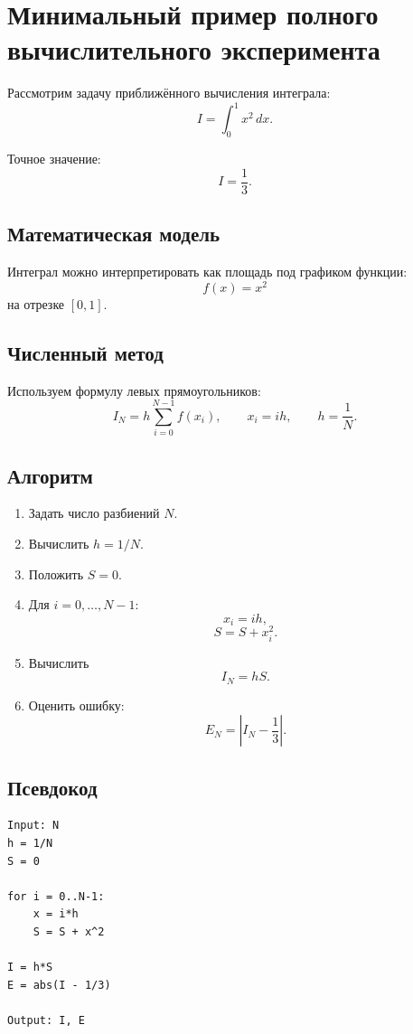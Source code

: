 \documentclass[12pt,a4paper]{article}
\theoremstyle{definition}
\theoremstyle{plain}
\begin{document}
\section{Минимальный пример полного вычислительного эксперимента}

Рассмотрим задачу приближённого вычисления интеграла:
\[
I=\int_0^1 x^2\,dx.
\]

Точное значение:
\[
I=\frac13.
\]

\subsection{Математическая модель}

Интеграл можно интерпретировать как площадь под графиком функции:
\[
f(x)=x^2
\]
на отрезке $[0,1]$.

\subsection{Численный метод}

Используем формулу левых прямоугольников:
\[
I_N
=
h\sum_{i=0}^{N-1} f(x_i),
\qquad
x_i=ih,\qquad h=\frac1N.
\]

\subsection{Алгоритм}

\begin{enumerate}
    \item Задать число разбиений $N$.
    \item Вычислить $h=1/N$.
    \item Положить $S=0$.
    \item Для $i=0,\dots,N-1$:
    \[
    x_i=ih,
    \]
    \[
    S=S+x_i^2.
    \]
    \item Вычислить
    \[
    I_N=hS.
    \]
    \item Оценить ошибку:
    \[
    E_N=\left|I_N-\frac13\right|.
    \]
\end{enumerate}

\subsection{Псевдокод}

\begin{lstlisting}[style=pseudo]
Input: N
h = 1/N
S = 0

for i = 0..N-1:
    x = i*h
    S = S + x^2

I = h*S
E = abs(I - 1/3)

Output: I, E
\end{lstlisting}
\end{document}
